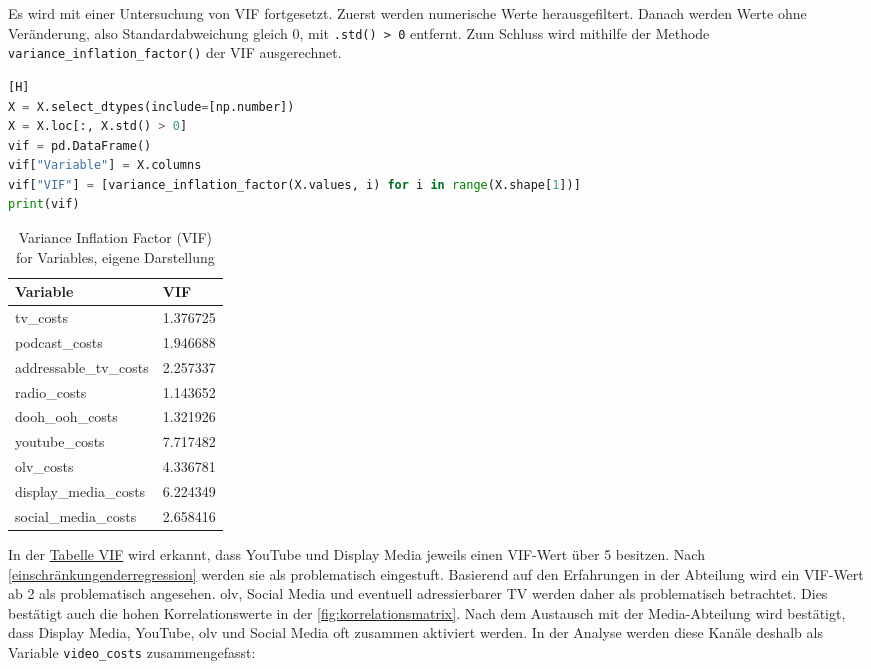 Es wird mit einer Untersuchung von \ac{VIF} fortgesetzt. Zuerst werden numerische Werte herausgefiltert. Danach werden Werte ohne Veränderung, also Standardabweichung gleich 0, mit \verb|.std() > 0| entfernt. Zum Schluss wird mithilfe der Methode \verb|variance_inflation_factor()| der \ac{VIF} ausgerechnet. 
\begin{lstlisting}[language=Python, linewidth=\textwidth][H]
X = X.select_dtypes(include=[np.number]) 
X = X.loc[:, X.std() > 0]
vif = pd.DataFrame()
vif["Variable"] = X.columns
vif["VIF"] = [variance_inflation_factor(X.values, i) for i in range(X.shape[1])]
print(vif)
\end{lstlisting}
\begin{table}[h]
    \centering
    \begin{tabular}{@{}ll@{}}
        \toprule
        Variable               & VIF       \\ \midrule
        tv\_costs              & 1.376725  \\
        podcast\_costs         & 1.946688  \\
        addressable\_tv\_costs & 2.257337  \\
        radio\_costs           & 1.143652  \\
        dooh\_ooh\_costs       & 1.321926  \\
        youtube\_costs         & 7.717482  \\
        olv\_costs             & 4.336781  \\
        display\_media\_costs  & 6.224349  \\
        social\_media\_costs   & 2.658416  \\ \bottomrule
    \end{tabular}
    \label{tab:viftabelle}
    \caption{Variance Inflation Factor (VIF) for Variables, eigene Darstellung}
\end{table}
In der \hyperref[tab:viftabelle]{Tabelle VIF} wird erkannt, dass YouTube und Display Media jeweils einen \ac{VIF}-Wert über 5 besitzen. Nach \autoref{einschränkungenderregression} werden sie als problematisch eingestuft. Basierend auf den Erfahrungen in der Abteilung wird ein \ac{VIF}-Wert ab 2 als problematisch angesehen. \ac{olv}, Social Media und eventuell adressierbarer TV werden daher als problematisch betrachtet. Dies bestätigt auch die hohen Korrelationswerte in der \autoref{fig:korrelationsmatrix}. Nach dem Austausch mit der Media-Abteilung wird bestätigt, dass Display Media, YouTube, \ac{olv} und Social Media oft zusammen aktiviert werden. In der Analyse werden diese Kanäle deshalb als Variable \verb|video_costs| zusammengefasst: 

